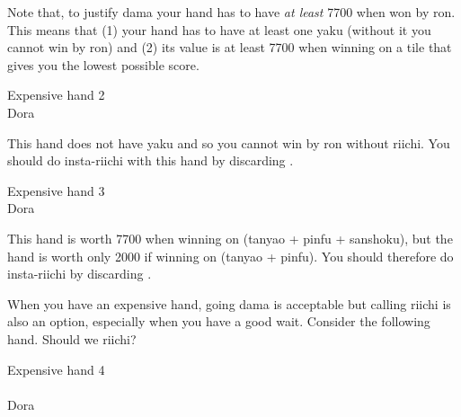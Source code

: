 \bigskip
Note that, to justify {\jap dama} your hand has to have \emph{at least} 7700 when won by {\jap ron}. This means that (1) your hand has to have at least one {\jap yaku} (without it you cannot win by {\jap ron}) and (2) its value is at least 7700 when winning on a tile that gives you the lowest possible score. 

\bigskip
\begin{itembox}[r]{Expensive hand 2}
\bp
{}~~\\
\hfill\footnotesize{{\jap Dora}~~~~~}
\ep
\vspace{-15pt}
\end{itembox}

\bigskip
This hand does not have {\jap yaku} and so you cannot win by {\jap ron} without riichi. You should do insta-riichi with this hand by discarding {\LARGE{}}. 

\bigskip
\begin{itembox}[r]{Expensive hand 3}
\bp
{}~~\bei\\
\hfill\footnotesize{{\jap Dora}~~~~~}
\ep
\vspace{-15pt}
\end{itembox}

\bigskip This hand is worth 7700 when winning on {\LARGE {}} ({\jap tanyao + pinfu + sanshoku}), but the hand is worth only 2000 if winning on {\LARGE {}} ({\jap tanyao + pinfu}). You should therefore do insta-riichi by discarding {\LARGE{}}. 

\bigskip
When you have an expensive hand, going {\jap dama} is acceptable but calling riichi is also an option, especially when you have a good wait. Consider the following hand. Should we riichi?

\bigskip
\begin{itembox}[r]{Expensive hand 4}
\bp
{}\\ \vspace{-16pt}
\rfs{}~~\\
\hfill\footnotesize{{\jap Dora}~~~~~}
\ep
\vspace{-15pt}
\end{itembox}

